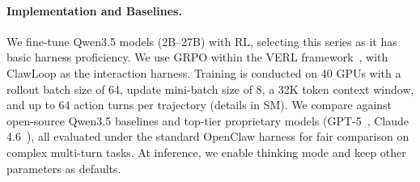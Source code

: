 \documentclass[letterpaper]{article} %
\begin{document}
\paragraph{Implementation and Baselines.}
We fine-tune Qwen3.5 models (2B–27B) with RL, selecting this series as it has basic harness proficiency.
We use GRPO within the VERL framework~\citep{sheng2024verl}, with ClawLoop as the interaction harness.
Training is conducted on 40 GPUs with a rollout batch size of 64, update mini-batch size of 8, a 32K token context window, and up to 64 action turns per trajectory (details in SM).
We compare against open-source Qwen3.5 baselines and top-tier proprietary models (GPT-5~\citep{OpenAIGPT5}, Claude 4.6~\citep{anthropic2024claude46}), 
all evaluated under the standard OpenClaw harness for fair comparison on complex multi-turn tasks.
At inference, we enable thinking mode and keep other parameters as defaults.
\end{document}
